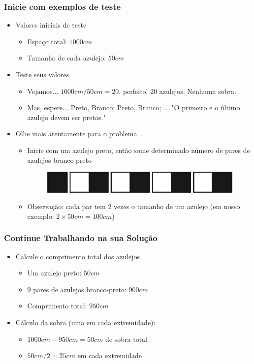 \documentclass[xcolor={dvipsnames,table},aspectratio=169]{beamer}
\begin{document}
\begin{frame}\frametitle{Inicie com exemplos de teste}
\begin{itemize}
	\item Valores iniciais de teste
	\begin{itemize}
		\item Espaço total: $1000cm$
		\item Tamanho de cada azulejo: $50cm$
	\end{itemize}
	\item Teste seus valores
	\begin{itemize}
		\item Vejamos... $1000cm/50cm = 20$, perfeito! $20$ azulejos. Nenhuma sobra.
		\item Mas, espere... Preto, Branco; Preto, Branco; ... "O primeiro e o último azulejo devem ser pretos."
	\end{itemize}
	\item Olhe mais atentamente para o problema...
	\begin{itemize}
		\item Inicie com um azulejo preto, então some determinado número de pares de azulejos branco-preto
\begin{figure}[h]
	\includegraphics[height=0.05\paperheight,center]{pucrs-ep-fprog-unidade_02-tipos_de_dados_fundamentais-laminas-exemplo_a_mao2.png}
\end{figure}
		\item Observação: cada par tem 2 vezes o tamanho de um azulejo (em nosso exemplo: $2 \times 50cm = 100cm$)
	\end{itemize}
\end{itemize}
\end{frame}

\begin{frame}\frametitle{Continue Trabalhando na sua Solução}
\begin{itemize}
	\item Calcule o comprimento total dos azulejos
	\begin{itemize}
		\item Um azulejo preto: $50cm$
		\item 9 pares de azulejos branco-preto: $900cm$
		\item Comprimento total: $950cm$
	\end{itemize}
	\item Cálculo da sobra (uma em cada extremidade):
	\begin{itemize}
		\item $1000cm - 950cm = 50cm$ de sobra total
		\item $50cm / 2 = 25cm$ em cada extremidade
	\end{itemize}
\end{itemize}
\end{frame}
\end{document}
